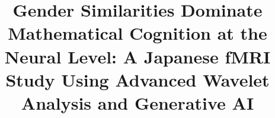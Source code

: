 \documentclass[pdflatex,reference]{sn-jnl}%
\theoremstyle{thmstyleone}%
\theoremstyle{thmstyletwo}%
\theoremstyle{thmstylethree}%
\begin{document}
\title[Gender Similarities Dominate Mathematical Cognition at the Neural Level: A Japanese fMRI Study Using Advanced Wavelet Analysis and Generative AI]{Gender Similarities Dominate Mathematical Cognition at the Neural Level: A Japanese fMRI Study Using Advanced Wavelet Analysis and Generative AI}


\author{ }






\end{document}
